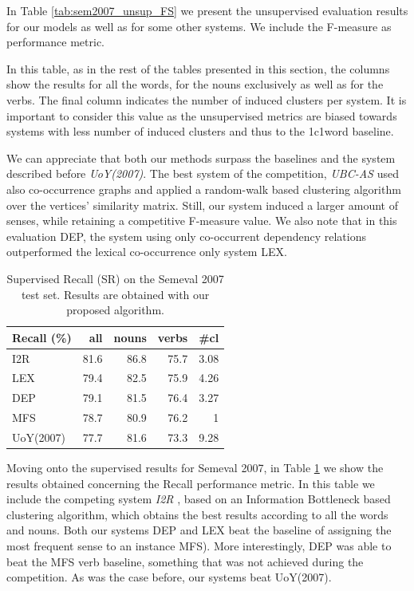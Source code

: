 In Table \ref{tab:sem2007_unsup_FS} we present the unsupervised evaluation results for our models as well as for some other systems. We include the F-measure as performance metric. 

In this table, as in the rest of the tables presented in this section, the columns show the results for all the words, for the nouns exclusively as well as for the verbs. The final column indicates the number of induced clusters per system. It is important to consider this value as the unsupervised metrics are biased towards systems with less number of induced clusters and thus to the 1c1word baseline.

We can appreciate that both our methods surpass the baselines and the system described before \textit{UoY(2007)}. The best system of the competition, \textit{UBC-AS} used also co-occurrence graphs and applied a random-walk based clustering algorithm over the vertices' similarity matrix. Still, our system induced a larger amount of senses, while retaining a competitive F-measure value. We also note that in this evaluation DEP, the system using only co-occurrent dependency relations outperformed the lexical co-occurrence only system LEX.

\begin{table}[!htb]
\centering
\caption{Supervised Recall (SR) on the Semeval 2007 test set. Results are obtained with our proposed algorithm.}
\begin{tabular}{@{}lrrrr@{}}
\toprule
\textbf{Recall (\%)} & \textbf{all} & \textbf{nouns} & \textbf{verbs} & \textbf{\#cl} \\ \midrule
I2R & 81.6 & 86.8 & 75.7 & 3.08 \\
LEX & 79.4 & 82.5 & 75.9 & 4.26 \\
DEP & 79.1 & 81.5 & 76.4 & 3.27\\
MFS & 78.7 & 80.9 & 76.2 & 1 \\
UoY(2007) & 77.7 & 81.6 & 73.3 & 9.28 \\ \bottomrule
\end{tabular}

\label{tab:sem2007_sup_recall}
\end{table}


Moving onto the supervised results for Semeval 2007, in Table \ref{tab:sem2007_sup_recall} we show the results obtained concerning the Recall performance metric.  In this table we include the competing system \textit{I2R} \cite{Niu2007}, based on an Information Bottleneck based clustering algorithm, which obtains the best results according to all the words and nouns. Both our systems DEP and LEX beat the baseline of assigning the most frequent sense to an instance MFS). More interestingly, DEP was able to beat the MFS verb baseline, something that was not achieved during the competition. As was the case before, our systems beat UoY(2007).




